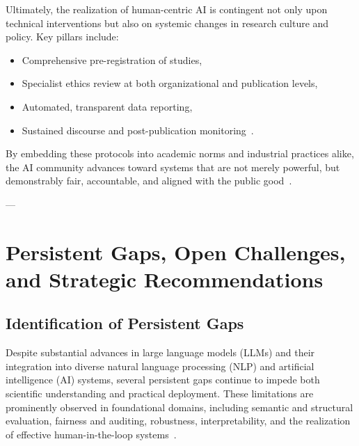 \documentclass[11pt]{article}
\begin{document}
Ultimately, the realization of human-centric AI is contingent not only upon technical interventions but also on systemic changes in research culture and policy. Key pillars include:
\begin{itemize}
    \item Comprehensive pre-registration of studies,
    \item Specialist ethics review at both organizational and publication levels,
    \item Automated, transparent data reporting,
    \item Sustained discourse and post-publication monitoring~\cite{ref40,ref52,ref53}.
\end{itemize}
By embedding these protocols into academic norms and industrial practices alike, the AI community advances toward systems that are not merely powerful, but demonstrably fair, accountable, and aligned with the public good~\cite{ref23,ref52,ref53,ref54,ref55}.

---
\section{Persistent Gaps, Open Challenges, and Strategic Recommendations}

\subsection{Identification of Persistent Gaps}

Despite substantial advances in large language models (LLMs) and their integration into diverse natural language processing (NLP) and artificial intelligence (AI) systems, several persistent gaps continue to impede both scientific understanding and practical deployment. These limitations are prominently observed in foundational domains, including semantic and structural evaluation, fairness and auditing, robustness, interpretability, and the realization of effective human-in-the-loop systems~\cite{ref2,ref7,ref10,ref12,ref13,ref15,ref16,ref17,ref18,ref19,ref20,ref22,ref24,ref25,ref26,ref28,ref30,ref31,ref32,ref33,ref34,ref36,ref37,ref38,ref39,ref42,ref43,ref44,ref46,ref47,ref48,ref49,ref50,ref52,ref53,ref54,ref55,ref56,ref57,ref58,ref59,ref60,ref66,ref67,ref68,ref69,ref70,ref76,ref77,ref78,ref79,ref80,ref86,ref87,ref88,ref89,ref90,ref91,ref92,ref93,ref94,ref95,ref96,ref97,ref98,ref99,ref100,ref101,ref102,ref103,ref104,ref105,ref106,ref107,ref108}.
\end{document}
